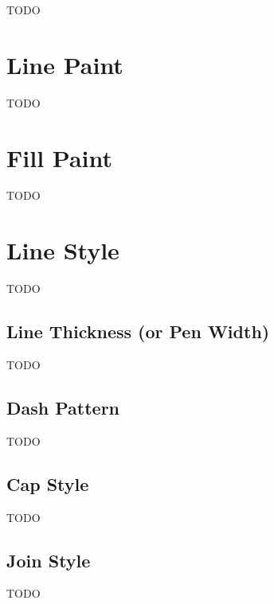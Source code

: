 TODO


\section{Line Paint}\label{sec:linepaint}


TODO


\section{Fill Paint}\label{sec:fillpaint}


TODO


\section{Line Style}\label{sec:pathstyle}

TODO


\subsection{Line Thickness (or Pen Width)}\label{sec:penwidth}


TODO


\subsection{Dash Pattern}\label{sec:dashpattern}


TODO


\subsection{Cap Style}\label{sec:capstyle}


TODO


\subsection{Join Style}\label{sec:joinstyle}


TODO


